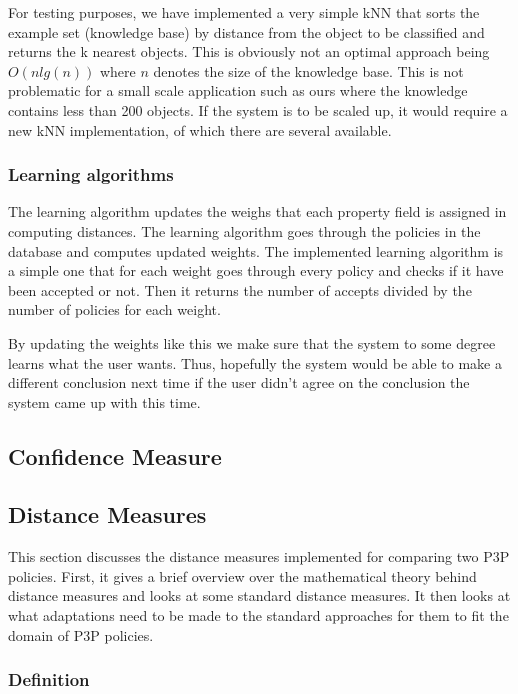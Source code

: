 For testing purposes, we have implemented a very simple kNN that sorts the example set (knowledge base) by distance from the object to be classified and returns the k nearest objects. This is obviously not an optimal approach being $O(n lg(n))$ where $n$ denotes the size of the knowledge base. This is not problematic for a small scale application such as ours where the knowledge contains less than 200 objects. If the system is to be scaled up, it would require a new kNN implementation, of which there are several available.


\subsubsection{Learning algorithms}\label{learnAlgos}
The learning algorithm updates the weighs that each property field is assigned in computing distances. The learning algorithm goes through the policies in the database and computes updated weights. The implemented learning algorithm is a simple one that for each weight goes through every policy and checks if it have been accepted or not. Then it returns the number of accepts divided by the number of policies for each weight.

By updating the weights like this we make sure that the system to some degree learns what the user wants. Thus, hopefully the system would be able to make a different conclusion next time if the user didn't agree on the conclusion the system came up with this time.

\subsection{Confidence Measure}\label{confidenceMeasure}%

\subsection{Distance Measures}\label{SimilarityMeasures}%

This section discusses the distance measures implemented for comparing two P3P policies. First, it gives a brief overview over the mathematical theory behind distance measures and looks at some standard distance measures. It then looks at what adaptations need to be made to the standard approaches for them to fit the domain of P3P policies.

\subsubsection{Definition}

